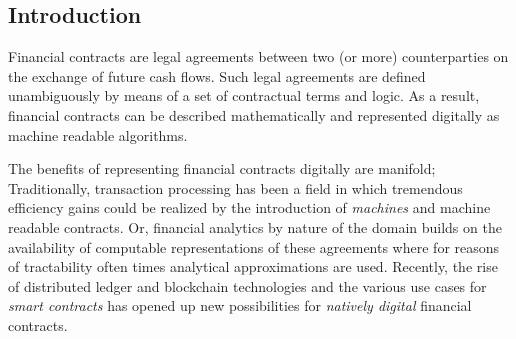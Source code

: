 \documentclass[9pt,oneside]{amsart}
\begin{document}
\newpage
\tableofcontents




\newpage

\setlength{\columnsep}{20pt}
\begin{multicols}{2}



\section{Introduction}\label{sec:intro}

Financial contracts are legal agreements between two (or more) counterparties on the exchange of future cash flows. Such legal agreements are defined unambiguously by means of a set of contractual terms and logic. As a result, financial contracts can be described mathematically and represented digitally as machine readable algorithms.

The benefits of representing financial contracts digitally are manifold; Traditionally, transaction processing has been a field in which tremendous efficiency gains could be realized by the introduction of \textit{machines} and machine readable contracts. Or, financial analytics by nature of the domain builds on the availability of computable representations of these agreements where for reasons of tractability often times analytical approximations are used. Recently, the rise of distributed ledger and blockchain technologies and the various use cases for \textit{smart contracts} has opened up new possibilities for \textit{natively digital} financial contracts.


\end{multicols}
\end{document}
